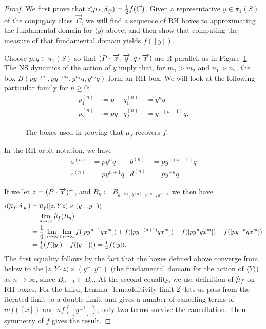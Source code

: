 \begin{proof}
  We first prove that $\vec{\imath}(\mu_f,\delta_{\vec C})={\textstyle \frac{1}{2}} f(\vec C)$. Given a representative $y \in \pi_1(S)$ of the conjugacy class~$\vec C$, we will find a sequence of RH boxes to approximating the fundamental domain for $\langle
y\rangle$ above, and then show that computing the measure of that
fundamental domain yields $f([y])$.

Choose $p,q \in \pi_1(S)$ so that $(P\cdot \overrightarrow{x}, \overrightarrow{y},
q\cdot\overrightarrow{x})$ are R-parallel, as in Figure~\ref{fig:recover-f}.
The NS dynamics of the action of $y$ imply that, for $m_1
> m_2$ and $n_1 > n_2$, the box
$B(py^{-m_1},py^{-m_2},y^{n_1}q,y^{n_2}q)$ form an RH box. We will look
at the following particular family for $n \ge 0$:
\begin{align*}
  p_1^{(n)} &\coloneqq p & q_1^{(n)}&\coloneqq y^n q\\
  p_2^{(n)} &\coloneqq p y &q_2^{(n)} &\coloneqq y^{-(n+1)} q.
\end{align*}

\begin{figure}
\caption{The boxes used in proving that $\mu_f$ recovers $f$.}
  \label{fig:recover-f}
\end{figure}

In the RH orbit notation, we have
\begin{align*}
  a^{(n)} &= p y^{n}   q &  b^{(n)} &= p y^{-(n+1)} q \\
  c^{(n)} &= p y^{n+1} q &  d^{(n)} &= p y^{-n} q.
\end{align*}

If we let $z=(P \cdot \overrightarrow{x})^-$, and $B_n \coloneqq B_{a^{(n)},
  b^{(n)}, c^{(n)}, d^{(n)}}$ we then have
    \begin{align*}
      \vec{\imath}(\overline\mu_f, \delta_{[y]})&=\overline\mu_f([z,Yz)\times(y^-,y^+)) \\
    &= \lim_{n\to\infty} \widehat{\mu}_f(B_n)  \\
    &= \frac{1}{4}\lim_{n\to\infty}\lim_{m\to\infty}f([py^{n+1}qx^{m}]) + f([py^{-(n+1)}qx^{m}])-f([py^{n}qx^{m}]) - f([py^{-n}qx^{m}]) \\
    &= {\textstyle \frac{1}{4}}\bigl(f([y]) + f([y^{-1}])\bigr) ={\textstyle \frac{1}{2}} f([y]).
    \end{align*}
    The first equality follows by the fact that the boxes defined above converge from below to the  $[z,Y\cdot z) \times (y^-,y^+)$ (the fundamental domain for the action of $\langle Y \rangle$) as $n \to \infty$, since $B_{n-1} \subset B_n$.
    At the second equality, we use definition of $\widehat{\mu}_f$ on RH boxes.
    For the third, Lemma~\ref{lem:additivity-limit-2} lets us pass from the iterated limit to a double limit, and gives a number of canceling terms of $mf([x])$ and $nf([y^{\pm 1}])$; only two terms survive the cancellation. Then symmetry of $f$ gives the result.


\end{proof}
